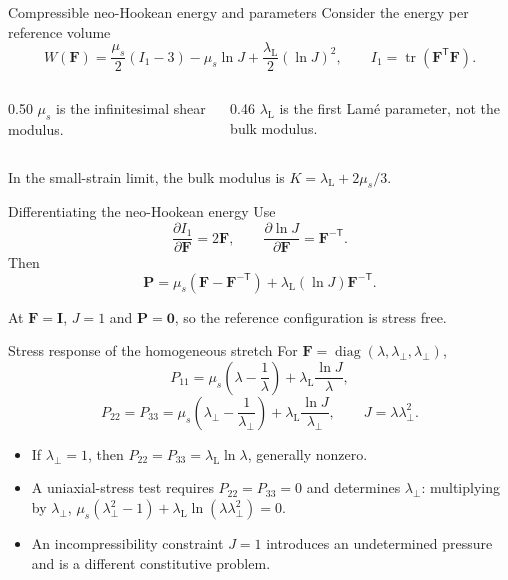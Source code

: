 \documentclass[aspectratio=169,11pt]{beamer}
\newcommand{\Ften}{\bm{F}}
\newcommand{\Pten}{\bm{P}}
\newcommand{\Identity}{\bm{I}}
\begin{document}
\begin{frame}{Compressible neo-Hookean energy and parameters}
Consider the energy per reference volume
\[
  W(\Ften)
  =
  \frac{\mu_s}{2}(I_1-3)
  -\mu_s\ln J
  +\frac{\lambda_{\mathrm L}}{2}(\ln J)^2,
  \qquad
  I_1=\operatorname{tr}(\Ften^{\mathsf T}\Ften).
\]
\begin{columns}[T,onlytextwidth]
\begin{column}{0.50\textwidth}
\(\mu_s\) is the infinitesimal shear modulus.
\end{column}
\begin{column}{0.46\textwidth}
\(\lambda_{\mathrm L}\) is the first Lamé parameter, not the bulk modulus.
\end{column}
\end{columns}
\medskip
\begin{punchbox}
\small In the small-strain limit, the bulk modulus is \(K=\lambda_{\mathrm L}+2\mu_s/3\).
\end{punchbox}
\end{frame}

\begin{frame}{Differentiating the neo-Hookean energy}
Use
\[
  \frac{\partial I_1}{\partial\Ften}=2\Ften,
  \qquad
  \frac{\partial\ln J}{\partial\Ften}=\Ften^{-\mathsf T}.
\]
Then
\[
\boxed{
  \Pten
  =
  \mu_s\left(\Ften-\Ften^{-\mathsf T}\right)
  +\lambda_{\mathrm L}(\ln J)\Ften^{-\mathsf T}
}.
\]
\begin{punchbox}
\small At \(\Ften=\Identity\), \(J=1\) and \(\Pten=\bm{0}\), so the reference configuration is stress free.
\end{punchbox}
\end{frame}

\begin{frame}{Stress response of the homogeneous stretch}
For \(\Ften=\operatorname{diag}(\lambda,\lambda_\perp,\lambda_\perp)\),
\[
  P_{11}
  =
  \mu_s\!\left(\lambda-\frac{1}{\lambda}\right)
  +\lambda_{\mathrm L}\frac{\ln J}{\lambda},
\]
\[
  P_{22}=P_{33}
  =
  \mu_s\!\left(\lambda_\perp-\frac{1}{\lambda_\perp}\right)
  +\lambda_{\mathrm L}\frac{\ln J}{\lambda_\perp},
  \qquad
  J=\lambda\lambda_\perp^2 .
\]
\begin{itemize}\itemsep5pt
  \item If \(\lambda_\perp=1\), then \(P_{22}=P_{33}=\lambda_{\mathrm L}\ln\lambda\), generally nonzero.
  \item A uniaxial-stress test requires \(P_{22}=P_{33}=0\) and determines \(\lambda_\perp\): multiplying by \(\lambda_\perp\), \(\mu_s(\lambda_\perp^2-1)+\lambda_{\mathrm L}\ln(\lambda\lambda_\perp^2)=0\).
  \item An incompressibility constraint \(J=1\) introduces an undetermined pressure and is a different constitutive problem.
\end{itemize}
\end{frame}
\end{document}
